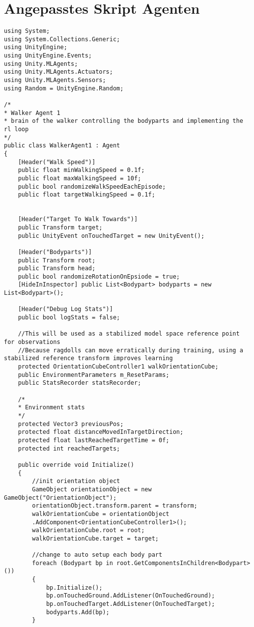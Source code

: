 \section{Angepasstes Skript Agenten}
\label{code:agent}
\begin{lstlisting}[caption={Agenten Skript},captionpos=b,label={lst:skript_agent1}]
using System;
using System.Collections.Generic;
using UnityEngine;
using UnityEngine.Events;
using Unity.MLAgents;
using Unity.MLAgents.Actuators;
using Unity.MLAgents.Sensors;
using Random = UnityEngine.Random;

/*
* Walker Agent 1
* brain of the walker controlling the bodyparts and implementing the rl loop
*/
public class WalkerAgent1 : Agent
{
    [Header("Walk Speed")]
    public float minWalkingSpeed = 0.1f;
    public float maxWalkingSpeed = 10f;
    public bool randomizeWalkSpeedEachEpisode;
    public float targetWalkingSpeed = 0.1f;


    [Header("Target To Walk Towards")]
    public Transform target;
    public UnityEvent onTouchedTarget = new UnityEvent();

    [Header("Bodyparts")]
    public Transform root;
    public Transform head;
    public bool randomizeRotationOnEpsiode = true;
    [HideInInspector] public List<Bodypart> bodyparts = new List<Bodypart>();

    [Header("Debug Log Stats")]
    public bool logStats = false;

    //This will be used as a stabilized model space reference point for observations
    //Because ragdolls can move erratically during training, using a stabilized reference transform improves learning
    protected OrientationCubeController1 walkOrientationCube;
    public EnvironmentParameters m_ResetParams;
    public StatsRecorder statsRecorder;

    /*
    * Environment stats
    */
    protected Vector3 previousPos;
    protected float distanceMovedInTargetDirection;
    protected float lastReachedTargetTime = 0f;
    protected int reachedTargets;

    public override void Initialize()
    {
        //init orientation object
        GameObject orientationObject = new GameObject("OrientationObject");
        orientationObject.transform.parent = transform;
        walkOrientationCube = orientationObject
        .AddComponent<OrientationCubeController1>();
        walkOrientationCube.root = root;
        walkOrientationCube.target = target;

        //change to auto setup each body part
        foreach (Bodypart bp in root.GetComponentsInChildren<Bodypart>())
        {
            bp.Initialize();
            bp.onTouchedGround.AddListener(OnTouchedGround);
            bp.onTouchedTarget.AddListener(OnTouchedTarget);
            bodyparts.Add(bp);
        }


\end{lstlisting}
